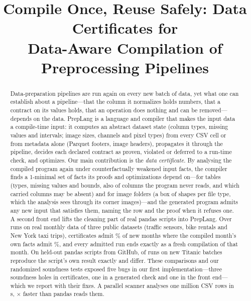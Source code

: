 \documentclass[conference]{IEEEtran}
\begin{document}
\title{Compile Once, Reuse Safely: Data Certificates for\\Data-Aware Compilation of Preprocessing Pipelines}

\author{
}

\maketitle

\begin{abstract}
Data-preparation pipelines are run again on every new batch of data, yet what one can establish
about a pipeline---that the column it normalizes holds numbers, that a contract on its values
holds, that an operation does nothing and can be removed---depends on the data. PrepLang is a
language and compiler that makes the input data a compile-time input: it computes an abstract
dataset state (column types, missing values and intervals; image sizes, channels and pixel types)
from every CSV cell or from metadata alone (Parquet footers, image headers), propagates it through
the pipeline, decides each declared contract as proven, violated or deferred to a run-time check,
and optimizes. Our main contribution is the \emph{data certificate}. By analysing the compiled
program again under counterfactually weakened input facts, the compiler finds a 1-minimal set of
facts its proofs and optimizations depend on---for tables (types, missing values and bounds, also
of columns the program never reads, and which carried columns may be absent) and for image folders
(a box of shapes per file type, which the analysis sees through its corner images)---and the
generated program admits any new input that satisfies them, naming the row and the proof when it
refuses one. A second front end lifts the cleaning part of real pandas scripts into PrepLang. Over
\RealRuns{} runs on real monthly data of three public datasets (traffic sensors, bike rentals and
New York taxi trips), certificates admit \RealAdmitPct\% of new months where the compiled month's
own facts admit \RealFactsPct\%, and every admitted run ends exactly as a fresh compilation of that
month. On \CorpusLifted{} held-out pandas scripts from GitHub, \CorpusSame{} of \CorpusRuns{} runs on
new Titanic batches reproduce the script's own result exactly and \CorpusUnsound{} differ. These
comparisons and our randomized soundness tests exposed five bugs in our first implementation---three
soundness holes in certificates, one in a generated check and one in the front end---which we
report with their fixes. A parallel scanner analyses one million CSV rows in
\CsvMillion\,s, \CsvSpeedup$\times$ faster than pandas reads them.
\end{abstract}
\end{document}
